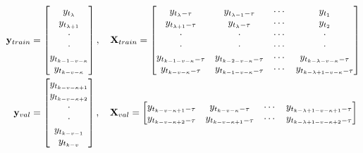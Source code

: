 \begin{align*}
    \mathbf{y}_{train} &=
    \begin{bmatrix}
        y_{t_\lambda}            \\
        y_{t_{\lambda + 1}}      \\
        \cdot                    \\
        \cdot                    \\
        y_{t_{k-1 - v - \kappa}} \\
        y_{t_{k - v - \kappa}}
    \end{bmatrix}
    , \quad
    \mathbf{X}_{train} =
    \begin{bmatrix}
        y_{t_{\lambda} - \tau}    & y_{t_{\lambda-1} - \tau}  & \cdots & y_{t_{1}}                         \\
        y_{t_{\lambda+1} - \tau}  & y_{t_{\lambda} - \tau}    & \cdots & y_{t_{2}}                         \\
        \cdot                     & \cdot                     & \cdots & \cdot                             \\
        \cdot                     & \cdot                     & \cdots & \cdot                             \\
        y_{t_{k-1-v-\kappa}-\tau} & y_{t_{k-2-v-\kappa}-\tau} & \cdots & y_{t_{k-\lambda-v-\kappa}-\tau}   \\
        y_{t_{k-v-\kappa}-\tau}   & y_{t_{k-1-v-\kappa}-\tau} & \cdots & y_{t_{k-\lambda+1-v-\kappa}-\tau}
    \end{bmatrix}\\
    \mathbf{y}_{val} &=
    \begin{bmatrix}
        y_{t_{k - v - \kappa + 1}}  \\
        y_{t_{k - v - \kappa + 2}}  \\
        \cdot                       \\
        \cdot                       \\
        y_{t_{k - v - 1}}           \\
        y_{t_{k - v}}            
    \end{bmatrix}
    , \quad
    \mathbf{X}_{val} =
    \begin{bmatrix}
        y_{t_{k-v-\kappa+1}-\tau} & y_{t_{k-v-\kappa}-\tau}   & \cdots & y_{t_{k-\lambda+1-v-\kappa+1}-\tau} \\
        y_{t_{k-v-\kappa+2}-\tau} & y_{t_{k-v-\kappa+1}-\tau} & \cdots & y_{t_{k-\lambda+1-v-\kappa+2}-\tau} \\

\end{bmatrix}
\end{align*}
